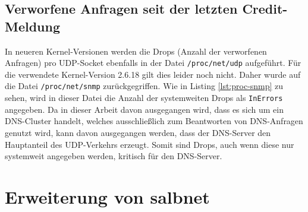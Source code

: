 \documentclass[a4paper, 12pt, BCOR10mm, DIV12, toc=bibliography, toc=listof, german]{scrbook}
\begin{document}
		


		\subsection*{Verworfene Anfragen seit der letzten Credit-Meldung} %

		In neueren Kernel-Versionen werden die Drops (Anzahl der verworfenen Anfragen) pro UDP-Socket
		ebenfalls in der Datei \texttt{/proc/net/udp} aufgeführt. Für die verwendete Kernel-Version
		2.6.18 gilt dies leider noch nicht. Daher wurde auf die Datei \texttt{/proc/net/snmp}
		zurückgegriffen. Wie in Listing \ref{lst:proc-snmp} zu sehen, wird in dieser Datei die Anzahl
		der systemweiten Drops als \texttt{InErrors} angegeben. Da in dieser Arbeit davon ausgegangen
		wird, dass es sich um ein DNS-Cluster handelt, welches ausschließlich zum Beantworten von
		DNS-Anfragen genutzt wird, kann davon	ausgegangen werden, dass der DNS-Server den Hauptanteil
		des UDP-Verkehrs erzeugt. Somit sind Drops, auch wenn diese nur systemweit angegeben werden,
		kritisch für den DNS-Server.
		
		


			

		\section{Erweiterung von salbnet} %
		\label{sec:erweiterung}

		
		
		
\end{document}
